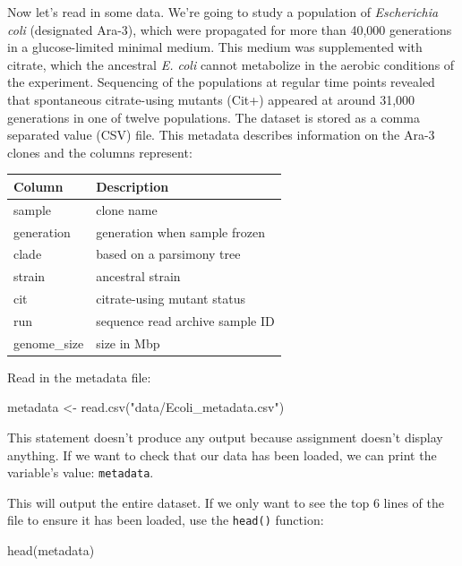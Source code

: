 \documentclass[
]{book}
\newenvironment{Shaded}{\begin{snugshade}}{\end{snugshade}}
\newcommand{\FunctionTok}[1]{\textcolor[rgb]{0.00,0.00,0.00}{#1}}
\newcommand{\NormalTok}[1]{#1}
\newcommand{\OtherTok}[1]{\textcolor[rgb]{0.56,0.35,0.01}{#1}}
\newcommand{\StringTok}[1]{\textcolor[rgb]{0.31,0.60,0.02}{#1}}
\begin{document}
Now let's read in some data. We're going to study a population of \emph{Escherichia coli} (designated Ara-3), which were propagated for more than 40,000 generations in a glucose-limited minimal medium. This medium was supplemented with citrate, which the ancestral \emph{E. coli} cannot metabolize in the aerobic conditions of the experiment. Sequencing of the populations at regular time points revealed that spontaneous citrate-using mutants (Cit+) appeared at around 31,000 generations in one of twelve populations. The dataset is stored as a comma separated value (CSV) file. This metadata describes information on the Ara-3 clones and the columns represent:

\begin{longtable}[]{@{}ll@{}}
\toprule
Column & Description \\
\midrule
\endhead
sample & clone name \\
generation & generation when sample frozen \\
clade & based on a parsimony tree \\
strain & ancestral strain \\
cit & citrate-using mutant status \\
run & sequence read archive sample ID \\
genome\_size & size in Mbp \\
\bottomrule
\end{longtable}

Read in the metadata file:

\begin{Shaded}
\begin{Highlighting}[]
\NormalTok{metadata }\OtherTok{\textless{}{-}} \FunctionTok{read.csv}\NormalTok{(}\StringTok{"data/Ecoli\_metadata.csv"}\NormalTok{)}
\end{Highlighting}
\end{Shaded}

This statement doesn't produce any output because assignment doesn't display anything. If we want to check that our data has been loaded, we can print the variable's value: \texttt{metadata}.

This will output the entire dataset. If we only want to see the top 6 lines of the file to ensure it has been loaded, use the \texttt{head()} function:

\begin{Shaded}
\begin{Highlighting}[]
\FunctionTok{head}\NormalTok{(metadata)}
\end{Highlighting}
\end{Shaded}
\end{document}
